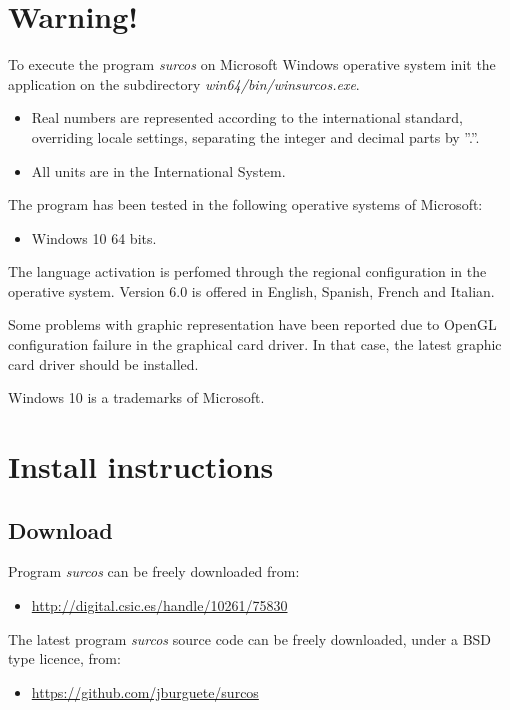 \chapter*{Warning!}

To execute the program \emph{surcos} on Microsoft Windows operative system init
the application on the subdirectory \emph{win64/bin/winsurcos.exe}.

\begin{itemize}
\item Real numbers are represented according to the international standard,
overriding locale settings, separating the integer and decimal parts by ''.''.
\item All units are in the International System.
\end{itemize}

The program has been tested in the following operative systems of Microsoft:
\begin{itemize}
\item Windows 10 64 bits.
\end{itemize}

The language activation is perfomed through the regional configuration in the 
operative system. Version 6.0 is offered in English, Spanish, French and
Italian. 

Some problems with graphic representation have been reported due to OpenGL 
configuration failure in the graphical card driver. In that case, the latest
graphic card driver should be installed.

Windows 10 is a trademarks of Microsoft.

\setcounter{page}{1}

\chapter{Install instructions}

\section{Download}

Program \emph{surcos} can be freely downloaded from:
\begin{itemize}
\item \url{http://digital.csic.es/handle/10261/75830}
\end{itemize}
The latest program \emph{surcos} source code can be freely downloaded, under
a BSD type licence, from:
\begin{itemize}
\item \url{https://github.com/jburguete/surcos}
\end{itemize}

